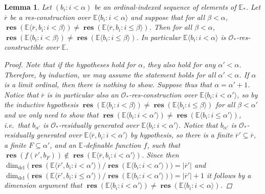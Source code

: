 \documentclass{amsart}
\newtheorem{lemma}[theorem]{Lemma}
\theoremstyle{remark}
\theoremstyle{definition}
\theoremstyle{plain}
\newcommand{\bE}{\mathbb E}
\newcommand{\cO}{\mathcal O}
\DeclareMathOperator{\res}{\mathbf{res}}
\DeclareMathOperator{\dcl}{\mathrm{dcl}}
\theoremstyle{plain}
\begin{document}
\begin{lemma}\label{lem:toname2}
    Let $(b_i : i <\alpha)$ be an ordinal-indexed sequence of elements of $\bE_*$.
    Let $\overline{r}$ be a res-construction over $\bE \langle b_i : i <\alpha\rangle$ and suppose that for all $\beta<\alpha$, $\res(\bE \langle \overline{r}, b_i: i< \beta \rangle)\neq \res(\bE \langle \overline{r}, b_i: i\le \beta\rangle)$. Then for all $\beta<\alpha$, $\res(\bE \langle b_i: i< \beta \rangle)\neq \res(\bE \langle b_i: i\le \beta\rangle)$. In particular $\bE \langle b_i: i< \alpha\rangle$ is $\cO_*$-res-constructible over $\bE$.
    \begin{proof}
        Note that if the hypotheses hold for $\alpha$, they also hold for any $\alpha' < \alpha$. Therefore, by induction, we may assume the statement holds for all $\alpha'<\alpha$.
        If $\alpha$ is a limit ordinal, then there is nothing to show.
        Suppose thus that $\alpha=\alpha'+1$. 
        Notice that $\overline{r}$ is in particular also an $\cO_*$-res-construction over $\bE \langle b_i: i< \alpha'\rangle$, so by the inductive hypothesis $\res(\bE \langle b_i: i<\beta\rangle) \neq \res(\bE \langle b_i: i \le \beta \rangle)$ for all $\beta<\alpha'$ and we only need to show that $\res(\bE \langle b_i: i <\alpha' \rangle) \neq \res(\bE \langle b_i: i\leq \alpha'\rangle)$, i.e.\ that $b_{\alpha'}$ is $\cO_*$-residually generated over $\bE \langle b_i: i <\alpha' \rangle$.
        Notice that $b_{\alpha'}$ is $\cO_*$-residually generated over $\bE \langle \overline{r}, b_i: i<\alpha'\rangle$ by hypothesis, so there is a finite $\overline{r}'\subseteq \overline{r}$, a finite $F \subseteq \alpha'$, and an $\bE$-definable function $f$, such that $\res(f(\overline{r}', b_F)) \notin \res(\bE \langle \overline{r}, b_i: i <\alpha'\rangle)$.
        Since then $\dim_{\dcl}\big( \res(\bE \langle \overline{r}', b_i: i <\alpha' \rangle)/\res(\bE\langle b_i: i< \alpha'\rangle)\big) = |\overline{r}'|$ and $\dim_{\dcl}\big( \res(\bE \langle \overline{r}', b_i: i \leq\alpha' \rangle)/\res(\bE\langle b_i: i< \alpha'\rangle)\big) = |\overline{r}'|+1$ it follows by a dimension argument that $\res(\bE \langle b_i :i< \alpha'\rangle)\neq \res(\bE \langle b_i: i <\alpha\rangle)$. 
    \end{proof}
\end{lemma}
\end{document}
